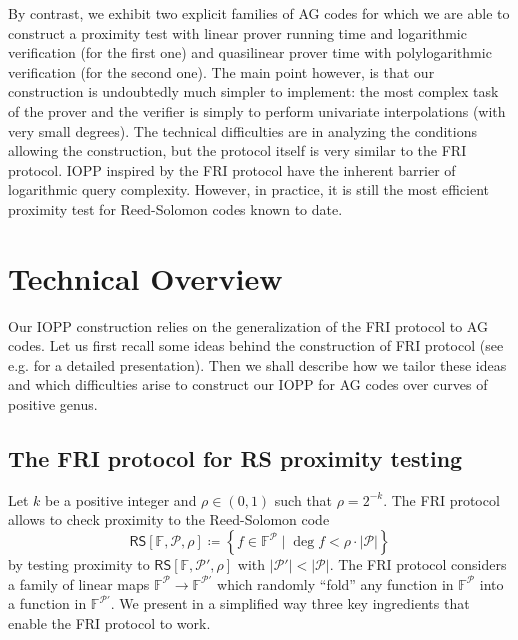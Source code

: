 \documentclass[10pt,a4paper]{article}
\newcommand\F{\mathbb{F}}
\newcommand\RS[1]{\mathsf{RS}\left[\F,#1\right]}
\newcommand{\set}[1]{\left\{#1\right\}}
\newcommand{\size}[1]{\left|#1\right|}
\newcommand\calP{\mathcal{P}}
\newcommand\mydef{\coloneqq}
\newcommand{\cd}{\cdot}
\theoremstyle{plain}
\theoremstyle{plain}
\theoremstyle{definition}
\theoremstyle{remark}
\theoremstyle{plain}
\begin{document}
By contrast, we exhibit two explicit families of AG codes for which we are able to construct a proximity test with linear prover running time and logarithmic verification (for the first one) and quasilinear prover time with polylogarithmic verification (for the second one). The main point however, is that our construction is undoubtedly much simpler to implement: the most complex task of the prover and the verifier is simply to perform univariate interpolations (with very small degrees). The technical difficulties are in analyzing the conditions allowing the construction, but the protocol itself is very similar to the \textsf{FRI} protocol. IOPP inspired by the \textsf{FRI} protocol have the inherent barrier of logarithmic query complexity. However, in practice, it is still the most efficient proximity test for Reed-Solomon codes known to date.

\section{Technical Overview}

Our IOPP construction relies on the generalization of the \textsf{FRI} protocol to AG codes. Let us first recall some ideas behind the construction of \textsf{FRI} protocol (see e.g. \cite{BKS18} for a detailed presentation). Then we shall describe how we tailor these ideas and which difficulties arise to construct our IOPP for AG codes over curves of positive genus.

\subsection{The \textsf{FRI} protocol for RS proximity testing}

Let $k$ be a positive integer and $\rho \in (0,1)$ such that $\rho = 2^{-k}$. The \textsf{FRI} protocol allows to check proximity to the Reed-Solomon code \[\RS{\calP,\rho} \mydef \set{f \in \F^\calP \mid \deg f < \rho \cd \size{\calP}}\] by testing proximity to $\RS{\calP',\rho}$ with $\size{\calP'}<\size{\calP}$. The \textsf{FRI} protocol considers a family of linear maps $\F^{\calP} \rightarrow \F^{\calP'}$ which randomly ``fold'' any function in $\F^{\calP}$ into a function in $\F^{\calP'}$. We present in a simplified way three key ingredients that enable the \textsf{FRI} protocol to work.
\end{document}
